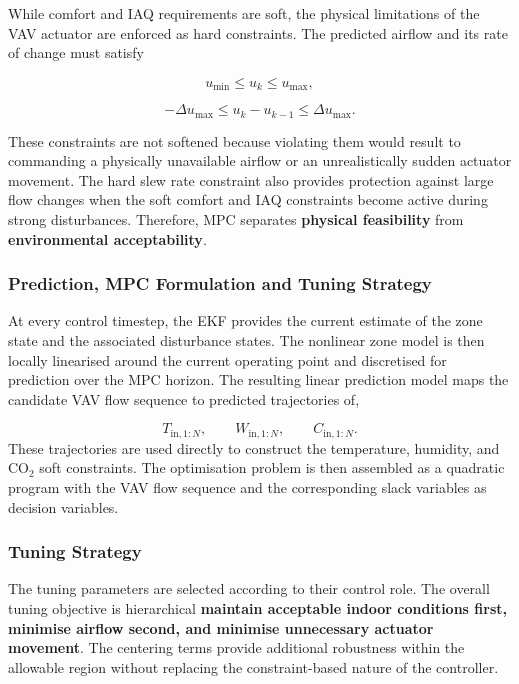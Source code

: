 \documentclass[12pt, a4paper]{article}
\begin{document}
	While comfort and IAQ requirements are soft, the physical limitations of the VAV actuator are enforced as hard constraints. The predicted airflow and its rate of change must satisfy
	
	\begin{equation}
		u_{\min}\leq u_k\leq u_{\max},
	\end{equation}
	
	\begin{equation}
		-\Delta u_{\max}
		\leq
		u_k-u_{k-1}
		\leq
		\Delta u_{\max}.
	\end{equation}
	
	These constraints are not softened because violating them would result to commanding a physically unavailable airflow or an unrealistically sudden actuator movement. The hard slew rate constraint also provides protection against large flow changes when the soft comfort and IAQ constraints become active during strong disturbances. Therefore, MPC separates \textbf{physical feasibility} from \textbf{environmental acceptability}. 
	
	\subsubsection{Prediction, MPC Formulation and Tuning Strategy}
	
	At every control timestep, the EKF provides the current estimate of the zone state and the associated disturbance states. The nonlinear zone model is then locally linearised around the current operating point and discretised for prediction over the MPC horizon. The resulting linear prediction model maps the candidate VAV flow sequence to predicted trajectories of,
	
	\[
	T_{\mathrm{in},1:N},\qquad
	W_{\mathrm{in},1:N},\qquad
	C_{\mathrm{in},1:N}.
	\]
	These trajectories are used directly to construct the temperature, humidity, and CO$_2$ soft constraints. The optimisation problem is then assembled as a quadratic program with the VAV flow sequence and the corresponding slack variables as decision variables.
	
	\subsubsection{Tuning Strategy}
	
	The tuning parameters are selected according to their control role.
	The overall tuning objective is  hierarchical \textbf{maintain acceptable indoor conditions first, minimise airflow second, and minimise unnecessary actuator movement}. The centering terms provide additional robustness within the allowable region without replacing the constraint-based nature of the controller.
	
\end{document}

